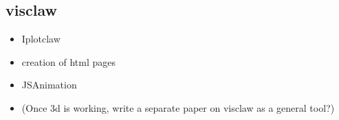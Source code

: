 %
%
%

\subsection{visclaw}
\begin{itemize}
    \item Iplotclaw
    \item creation of html pages
    \item JSAnimation
    \item (Once 3d is working, write a separate paper on visclaw as a general tool?)
\end{itemize}